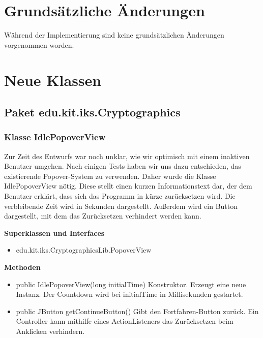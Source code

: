 \documentclass{article}
\begin{document}
\section{Grundsätzliche Änderungen}
Während der Implementierung sind keine grundsätzlichen Änderungen vorgenommen worden.

\section{Neue Klassen}

  \subsection{Paket edu.kit.iks.Cryptographics}
    \subsubsection{Klasse IdlePopoverView}
    Zur Zeit des Entwurfs war noch unklar, wie wir optimisch mit einem inaktiven Benutzer umgehen.
    Nach einigen Tests haben wir uns dazu entschieden, das existierende Popover-System zu verwenden. Daher wurde
    die Klasse IdlePopoverView nötig. Diese stellt einen kurzen Informationstext dar, der dem Benutzer erklärt,
    dass sich das Programm in kürze zurücksetzen wird. Die verbleibende Zeit wird in Sekunden dargestellt. Außerdem
    wird ein Button dargestellt, mit dem das Zurücksetzen verhindert werden kann.\newline

    \textbf{Superklassen und Interfaces}
      \begin{itemize}
        \item edu.kit.iks.CryptographicsLib.PopoverView
      \end{itemize}
           
    \textbf{Methoden}
      \begin{itemize}
        \item public IdlePopoverView(long initialTime)\newline
              Konstruktor. Erzeugt eine neue Instanz. Der Countdown wird bei initialTime in Millisekunden
              gestartet.
        \item public JButton getContinueButton()\newline
              Gibt den Fortfahren-Button zurück. Ein Controller kann mithilfe eines ActionListeners
              das Zurücksetzen beim Anklicken verhindern.
      \end{itemize}
\end{document}
